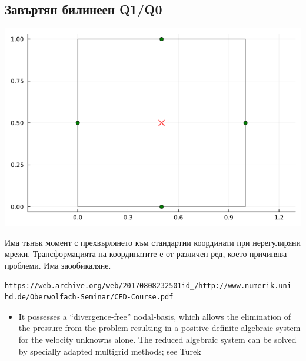 \documentclass[fleqn,12pt]{article}
\begin{document}
\subsection{Завъртян билинеен Q1/Q0}
\includegraphics[width=140mm]{img/rotbl.png}

Има тънък момент с прехвърлянето към стандартни координати при нерегулиряни мрежи.
Трансформацията на координатите е от различен ред, което причинява проблеми.
Има заообикаляне.

\begin{verbatim}
https://web.archive.org/web/20170808232501id_/http://www.numerik.uni-hd.de/Oberwolfach-Seminar/CFD-Course.pdf
\end{verbatim}
\begin{itemize}
    \item It possesses a “divergence-free” nodal-basis, which allows the elimination of the pressure from the problem resulting in a positive definite algebraic
system for the velocity unknowns alone. The reduced algebraic system can be
solved by specially adapted multigrid methods; see Turek
\end{itemize}
\end{document}
